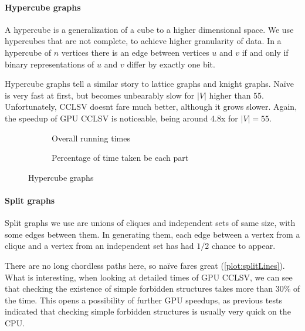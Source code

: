 \paragraph{Hypercube graphs}

A hypercube is a generalization of a cube to a higher dimensional space. We use hypercubes that are not complete, to achieve higher granularity of data. In a hypercube of $n$ vertices there is an edge between vertices $u$ and $v$ if and only if binary representations of $u$ and $v$ differ by exactly one bit.

Hypercube graphs tell a similar story to lattice graphs and knight graphs. Na\"ive is very fast at first, but becomes unbearably slow for $|V|$ higher than 55. Unfortunately, CCLSV doesnt fare much better, although it grows slower. Again, the speedup of GPU CCLSV is noticeable, being around 4.8x for $|V| = 55$.

\begin{figure}
  \begin{subfigure}{\textwidth}
    \centering
    
    \caption{Overall running times}
    \label{plot:hypercubeLines}
  \end{subfigure}

  \begin{subfigure}{\textwidth}
    \centering
    
    \caption{Percentage of time taken be each part}
    \label{plot:hypercubeDet}
  \end{subfigure}
  \caption{Hypercube graphs}
\end{figure}

\paragraph{Split graphs}

Split graphs we use are unions of cliques and independent sets of same size, with some edges between them. In generating them, each edge between a vertex from a clique and a vertex from an independent set has had $1/2$ chance to appear.

There are no long chordless paths here, so na\"ive fares great (\cref{plot:splitLines}). What is interesting, when looking at detailed times of GPU CCLSV, we can see that checking the existence of simple forbidden structures takes more than 30\% of the time. This opens a possibility of further GPU speedups, as previous tests indicated that checking simple forbidden structures is usually very quick on the CPU.

